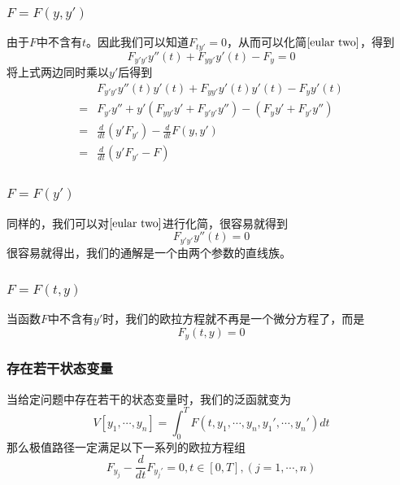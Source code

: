\documentclass[UTF8,12pt]{ctexart}
\numberwithin{equation}{section} %
\numberwithin{figure}{section}
\numberwithin{table}{section}
\begin{document}
	\subsubsection{$F = F(y,y')$}
	由于$F$中不含有$t$。因此我们可以知道$F_{ty'} = 0$，从而可以化简$\ref{eular two}$，得到
	\begin{equation}
		F_{y'y'}y''(t) + F_{yy'}y'(t) - F_y = 0
	\end{equation}
	将上式两边同时乘以$y'$后得到
	\begin{equation}
		\begin{aligned}
			&F_{y'y'}y''(t)y'(t) + F_{yy'}y'(t)y'(t) - F_yy'(t) \\
			= &F_{y'}y'' + y'(F_{yy'}y' + F_{y'y'}y'') - (F_yy' + F_{y'}y'') \\
			= &\frac{d}{dt}(y'F_{y'}) - \frac{d}{dt}F(y,y') \\
			=& \frac{d}{dt}(y'F_{y'}-F)
		\end{aligned} 
	\end{equation}
	
	
	\subsubsection{$F = F(y')$}
	同样的，我们可以对$\ref{eular two}$进行化简，很容易就得到
	\begin{equation}
		F_{y'y'}y''(t) = 0
	\end{equation}
	很容易就得出，我们的通解是一个由两个参数的直线族。
	
	\subsubsection{$F = F(t,y)$}
	当函数$F$中不含有$y'$时，我们的欧拉方程就不再是一个微分方程了，而是
	\begin{equation}
		F_y(t,y) = 0
	\end{equation}

	\subsubsection{存在若干状态变量}
	当给定问题中存在若干的状态变量时，我们的泛函就变为
	\begin{equation}
		V[y_1,\cdots,y_n] = \int_{0}^{T}F(t,y_1,\cdots,y_n,y_1',\cdots,y_n')dt
	\end{equation}
	那么极值路径一定满足以下一系列的欧拉方程组
	\begin{equation}
		F_{y_j} - \frac{d}{dt}F_{y_j'} = 0,t\in[0,T],(j = 1,\cdots,n)
	\end{equation}
	
\end{document}
